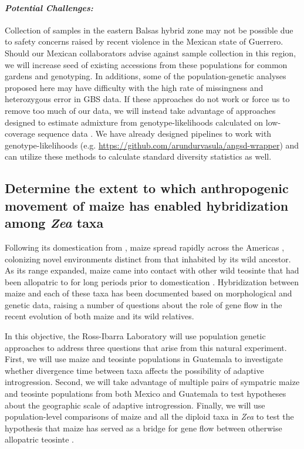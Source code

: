 \paragraph{\emph{Potential Challenges:}}
Collection of samples in the eastern Balsas hybrid zone may not be possible due to safety concerns raised by recent violence in the Mexican state of Guerrero.
Should our Mexican collaborators advise against sample collection in this region, we will increase seed of existing accessions from these populations for common gardens and genotyping.
In additions, some of the population-genetic analyses proposed here may have difficulty with the high rate of missingness and heterozygous error in GBS data.
If these approaches do not work or force us to remove too much of our data, we will instead take advantage of approaches designed  to estimate admixture from genotype-likelihoods calculated on low-coverage sequence data \citep{skotte2013estimating}. 
We have already designed pipelines to work with genotype-likelihoods (e.g. \url{https://github.com/arundurvasula/angsd-wrapper}) and can utilize these methods to calculate standard diversity statistics as well.  

\subsection{Determine the extent to which anthropogenic movement of maize has enabled hybridization among \emph{Zea} taxa} 
\label{ss:genuswide}
Following its domestication from \zp{}, maize spread rapidly across the Americas \citep{Piperno2001,Grobman2012}, colonizing novel environments distinct from that inhabited by its wild ancestor. 
As its range expanded, maize came into contact with other wild teosinte that had been allopatric to \zp{} for long periods prior to domestication \citep{hufford2012inferences}.  
Hybridization between maize and each of these taxa has been documented based on morphological \citep{wilkes1967teosinte, Wilkes1977} and genetic \citep{doebley1990molecular,Fukunaga2005,Ross-Ibarra2009a,vanheerwaarden2011a} data, raising a number of questions about the role of gene flow in the recent evolution of both maize and its wild relatives.

In this objective, the Ross-Ibarra Laboratory will use population genetic approaches to address three questions that arise from this natural experiment.  
First, we will use maize and teosinte populations in Guatemala to investigate whether divergence time between taxa affects the possibility of adaptive introgression. 
Second, we will take advantage of multiple pairs of sympatric maize and teosinte populations from both Mexico and Guatemala to test hypotheses about the geographic scale of adaptive introgression.
Finally, we will use population-level comparisons of maize and all the diploid taxa in \emph{Zea} to test the hypothesis that maize has served as a bridge for gene flow between otherwise allopatric teosinte \citep{Ross-Ibarra2009a}.



